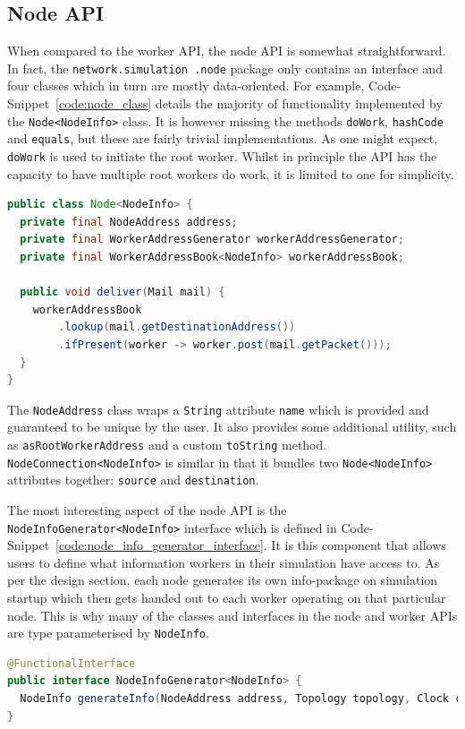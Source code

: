 \subsection{Node API}\label{subsection:node_api}

When compared to the worker API, the node API is somewhat straightforward. In fact, the \texttt{network.simulation
.node} package only contains an interface and four classes which in turn are mostly data-oriented. For example,
Code-Snippet~\ref{code:node_class} details the majority of functionality implemented by the \texttt{Node<NodeInfo>}
class. It is however missing the methods \texttt{doWork}, \texttt{hashCode} and \texttt{equals}, but these are fairly
trivial implementations. As one might expect, \texttt{doWork} is used to initiate the root worker. Whilst in
principle the API has the capacity to have multiple root workers do work, it is limited to one for simplicity.
\begin{lstlisting}[language=Java,caption={A cut-down version of the \texttt{Node<NodeInfo>} class.},
    label={code:node_class},captionpos=b]
public class Node<NodeInfo> {
  private final NodeAddress address;
  private final WorkerAddressGenerator workerAddressGenerator;
  private final WorkerAddressBook<NodeInfo> workerAddressBook;

  public void deliver(Mail mail) {
    workerAddressBook
        .lookup(mail.getDestinationAddress())
        .ifPresent(worker -> worker.post(mail.getPacket()));
  }
}
\end{lstlisting}

The \texttt{NodeAddress} class wraps a \texttt{String} attribute \texttt{name} which is provided and guaranteed to be
unique by the user. It also provides some additional utility, such as \texttt{asRootWorkerAddress} and a custom
\texttt{toString} method. \texttt{NodeConnection<NodeInfo>} is similar in that it bundles two \texttt{Node<NodeInfo>}
attributes together: \texttt{source} and \texttt{destination}.

The most interesting aspect of the node API is the \texttt{NodeInfoGenerator<NodeInfo>} interface which is defined in
Code-Snippet~\ref{code:node_info_generator_interface}. It is this component that allows users to define what
information workers in their simulation have access to. As per the design section, each node generates its own
info-package on simulation startup which then gets handed out to each worker operating on that particular node. This
is why many of the classes and interfaces in the node and worker APIs are type parameterised by \texttt{NodeInfo}.
\begin{lstlisting}[language=Java,caption={The \texttt{NodeInfoGenerator<NodeInfo>} interface exactly as it appears in
the
codebase.},label={code:node_info_generator_interface},captionpos=b]
@FunctionalInterface
public interface NodeInfoGenerator<NodeInfo> {
  NodeInfo generateInfo(NodeAddress address, Topology topology, Clock clock);
}
\end{lstlisting}

